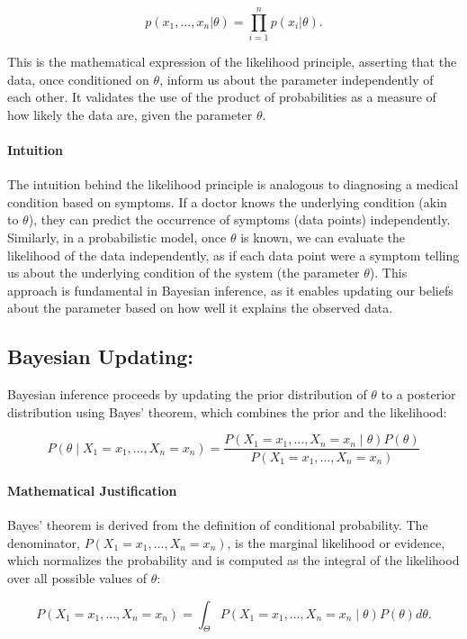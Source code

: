 \documentclass{article}
\begin{document}
\[
p(x_1, \ldots, x_n | \theta) = \prod_{i=1}^{n} p(x_i | \theta).
\]

This is the mathematical expression of the likelihood principle, asserting that the data, once conditioned on \( \theta \), inform us about the parameter independently of each other. It validates the use of the product of probabilities as a measure of how likely the data are, given the parameter \( \theta \).

\paragraph{Intuition}
The intuition behind the likelihood principle is analogous to diagnosing a medical condition based on symptoms. If a doctor knows the underlying condition (akin to \( \theta \)), they can predict the occurrence of symptoms (data points) independently. Similarly, in a probabilistic model, once \( \theta \) is known, we can evaluate the likelihood of the data independently, as if each data point were a symptom telling us about the underlying condition of the system (the parameter \( \theta \)). This approach is fundamental in Bayesian inference, as it enables updating our beliefs about the parameter based on how well it explains the observed data.



\subsection{Bayesian Updating:}
Bayesian inference proceeds by updating the prior distribution of \( \theta \) to a posterior distribution using Bayes' theorem, which combines the prior and the likelihood:

\[
P(\theta \mid X_1 = x_1, \ldots, X_n = x_n) = \frac{P(X_1 = x_1, \ldots, X_n = x_n \mid \theta) P(\theta)}{P(X_1 = x_1, \ldots, X_n = x_n)}
\]

\paragraph{Mathematical Justification}
Bayes' theorem is derived from the definition of conditional probability. The denominator, \( P(X_1 = x_1, \ldots, X_n = x_n) \), is the marginal likelihood or evidence, which normalizes the probability and is computed as the integral of the likelihood over all possible values of \( \theta \):

\[
P(X_1 = x_1, \ldots, X_n = x_n) = \int_{\Theta} P(X_1 = x_1, \ldots, X_n = x_n \mid \theta) P(\theta) d\theta.
\]
\end{document}
